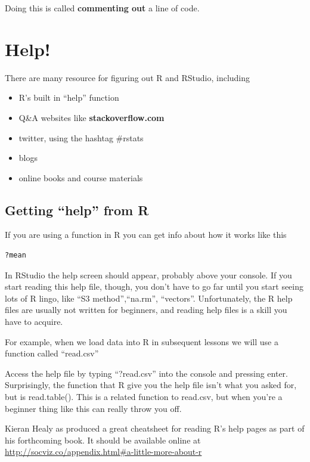 \documentclass[
]{book}
\providecommand{\tightlist}{%
  \setlength{\itemsep}{0pt}\setlength{\parskip}{0pt}}
\begin{document}
Doing this is called \textbf{commenting out} a line of code.

\hypertarget{help}{%
\section{Help!}\label{help}}

There are many resource for figuring out R and RStudio, including

\begin{itemize}
\tightlist
\item
  R's built in ``help'' function
\item
  Q\&A websites like \textbf{stackoverflow.com}
\item
  twitter, using the hashtag \#rstats
\item
  blogs
\item
  online books and course materials
\end{itemize}

\hypertarget{getting-help-from-r}{%
\subsection{Getting ``help'' from R}\label{getting-help-from-r}}

If you are using a function in R you can get info about how it works like this

\begin{lstlisting}[language=R]
?mean
\end{lstlisting}

In RStudio the help screen should appear, probably above your console. If you start reading this help file, though, you don't have to go far until you start seeing lots of R lingo, like ``S3 method'',``na.rm'', ``vectors''. Unfortunately, the R help files are usually not written for beginners, and reading help files is a skill you have to acquire.

For example, when we load data into R in subsequent lessons we will use a function called ``read.csv''

Access the help file by typing ``?read.csv'' into the console and pressing enter. Surprisingly, the function that R give you the help file isn't what you asked for, but is read.table(). This is a related function to read.csv, but when you're a beginner thing like this can really throw you off.

Kieran Healy as produced a great cheatsheet for reading R's help pages as part of his forthcoming book. It should be available online at \url{http://socviz.co/appendix.html\#a-little-more-about-r}
\end{document}
